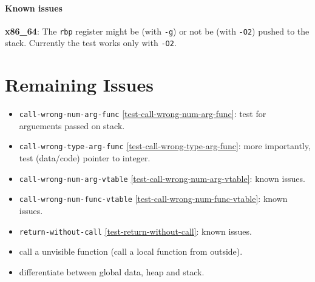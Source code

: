 \documentclass[a4paper]{book}
\begin{document}
\subsubsection{Known issues}
\textbf{x86\_64}: The \texttt{rbp} register might be (with \texttt{-g}) or not be (with \texttt{-O2}) pushed to the stack.
Currently the test works only with \texttt{-O2}.

\chapter{Remaining Issues}

\begin{itemize}
  \item \texttt{call-wrong-num-arg-func} \ref{test-call-wrong-num-arg-func}: test for arguements passed on stack.
  \item \texttt{call-wrong-type-arg-func} \ref{test-call-wrong-type-arg-func}: more importantly, test (data/code) pointer to integer.
  \item \texttt{call-wrong-num-arg-vtable} \ref{test-call-wrong-num-arg-vtable}: known issues.
  \item \texttt{call-wrong-num-func-vtable} \ref{test-call-wrong-num-func-vtable}: known issues.
  \item \texttt{return-without-call} \ref{test-return-without-call}: known issues.
  \item call a unvisible function (call a local function from outside).
  \item differentiate between global data, heap and stack.
\end{itemize}
\end{document}
